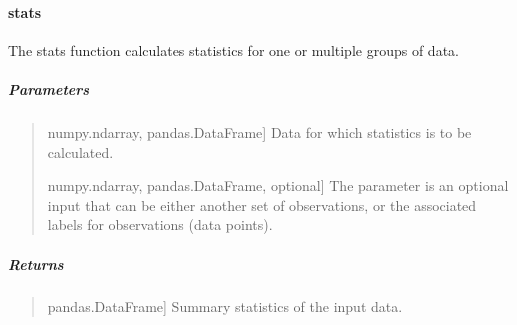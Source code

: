 \documentclass[letterpaper,10pt,english,openany,oneside]{sphinxmanual}
\begin{document}
\begin{fulllineitems}
\end{fulllineitems}




\sphinxstepscope


\paragraph{stats}
\label{\detokenize{api_reference/generated/QuadratiK.tools.stats:stats}}\label{\detokenize{api_reference/generated/QuadratiK.tools.stats::doc}}

\begin{fulllineitems}
\label{\detokenize{api_reference/generated/QuadratiK.tools.stats:QuadratiK.tools.stats}}
\pysigstartsignatures
{}
\pysigstopsignatures
\sphinxAtStartPar
The stats function calculates statistics for one or multiple groups of data.


\subparagraph{Parameters}
\label{\detokenize{api_reference/generated/QuadratiK.tools.stats:parameters}}\begin{quote}
\begin{description}
\sphinxlineitem{x}{[}numpy.ndarray, pandas.DataFrame{]}
\sphinxAtStartPar
Data for which statistics is to be calculated.

\sphinxlineitem{y}{[}numpy.ndarray, pandas.DataFrame, optional{]}
\sphinxAtStartPar
The parameter  is an optional input that can be either another set of observations,
or the associated labels for observations (data points).

\end{description}
\end{quote}


\subparagraph{Returns}
\label{\detokenize{api_reference/generated/QuadratiK.tools.stats:returns}}\begin{quote}
\begin{description}
\sphinxlineitem{summary statistics}{[}pandas.DataFrame{]}
\sphinxAtStartPar
Summary statistics of the input data.

\end{description}
\end{quote}



\end{fulllineitems}
\end{document}
